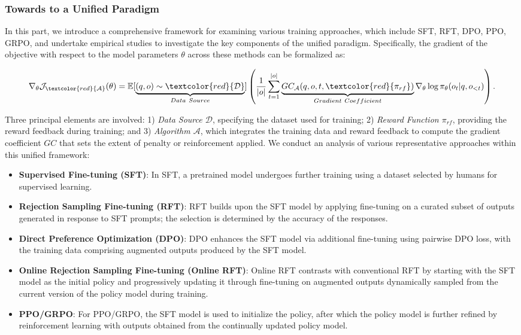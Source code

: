 \begin{itemize}[topsep=0pt]
\begin{itemize}[topsep=0pt]
\subsubsection{Towards to a Unified Paradigm} In this part, we introduce a comprehensive framework for examining various training approaches, which include SFT, RFT, DPO, PPO, GRPO, and undertake empirical studies to investigate the key components of the unified paradigm. Specifically, the gradient of the objective with respect to the model parameters $\theta$ across these methods can be formalized as:

\begin{equation}
    \nabla_{\theta}\mathcal{J}_{\textcolor{red}{\mathcal{A}}}(\theta) = \mathbb{E}[\underbrace{(q,o) \sim \textcolor{red}{\mathcal{D}}}_{Data \ Source}]\left( \frac{1}{|o|} \sum_{t=1}^{|o|}  \underbrace{GC_{{\mathcal{A}}}(q, o, t, \textcolor{red}{\pi_{{rf}}})}_{Gradient \ Coefficient}  \nabla_{\theta}\log \pi_{\theta}(o_t | q, o_{<t})\right).
\label{eq:objective}
\end{equation}

Three principal elements are involved: 1) \textit{Data Source $\mathcal{D}$}, specifying the dataset used for training; 2) \textit{Reward Function $\pi_{{rf}}$}, providing the reward feedback during training; and 3) \textit{Algorithm $\mathcal{A}$}, which integrates the training data and reward feedback to compute the gradient coefficient $GC$ that sets the extent of penalty or reinforcement applied. We conduct an analysis of various representative approaches within this unified framework:

\begin{itemize}
    \item \textbf{Supervised Fine-tuning (SFT)}: In SFT, a pretrained model undergoes further training using a dataset selected by humans for supervised learning.
    \item \textbf{Rejection Sampling Fine-tuning (RFT)}: RFT builds upon the SFT model by applying fine-tuning on a curated subset of outputs generated in response to SFT prompts; the selection is determined by the accuracy of the responses.
    \item \textbf{Direct Preference Optimization (DPO)}: DPO enhances the SFT model via additional fine-tuning using pairwise DPO loss, with the training data comprising augmented outputs produced by the SFT model.
    \item \textbf{Online Rejection Sampling Fine-tuning (Online RFT)}: Online RFT contrasts with conventional RFT by starting with the SFT model as the initial policy and progressively updating it through fine-tuning on augmented outputs dynamically sampled from the current version of the policy model during training.
    \item \textbf{PPO/GRPO}: For PPO/GRPO, the SFT model is used to initialize the policy, after which the policy model is further refined by reinforcement learning with outputs obtained from the continually updated policy model.
\end{itemize}


\end{itemize}
\end{itemize}
